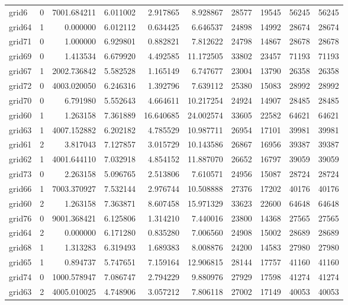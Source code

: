 \begin{longtable}{|l|r|r|r|r|r|r|r|r|r|}
grid6 & 0 & 7001.684211 & 6.011002 & 2.917865 & 8.928867 & 28577 & 19545 & 56245 & 56245 \\
grid64 & 1 & 0.000000 & 6.012112 & 0.634425 & 6.646537 & 24898 & 14992 & 28674 & 28674 \\
grid71 & 0 & 1.000000 & 6.929801 & 0.882821 & 7.812622 & 24798 & 14867 & 28678 & 28678 \\
grid69 & 0 & 1.413534 & 6.679920 & 4.492585 & 11.172505 & 33802 & 23457 & 71193 & 71193 \\
grid67 & 1 & 2002.736842 & 5.582528 & 1.165149 & 6.747677 & 23004 & 13790 & 26358 & 26358 \\
grid72 & 0 & 4003.020050 & 6.246316 & 1.392796 & 7.639112 & 25380 & 15083 & 28992 & 28992 \\
grid70 & 0 & 6.791980 & 5.552643 & 4.664611 & 10.217254 & 24924 & 14907 & 28485 & 28485 \\
grid60 & 1 & 1.263158 & 7.361889 & 16.640685 & 24.002574 & 33605 & 22582 & 64621 & 64621 \\
grid63 & 1 & 4007.152882 & 6.202182 & 4.785529 & 10.987711 & 26954 & 17101 & 39981 & 39981 \\
grid61 & 2 & 3.817043 & 7.127857 & 3.015729 & 10.143586 & 26867 & 16956 & 39387 & 39387 \\
grid62 & 1 & 4001.644110 & 7.032918 & 4.854152 & 11.887070 & 26652 & 16797 & 39059 & 39059 \\
grid73 & 0 & 2.263158 & 5.096765 & 2.513806 & 7.610571 & 24956 & 15087 & 28724 & 28724 \\
grid66 & 1 & 7003.370927 & 7.532144 & 2.976744 & 10.508888 & 27376 & 17202 & 40176 & 40176 \\
grid60 & 2 & 1.263158 & 7.363871 & 8.607458 & 15.971329 & 33623 & 22600 & 64648 & 64648 \\
grid76 & 0 & 9001.368421 & 6.125806 & 1.314210 & 7.440016 & 23800 & 14368 & 27565 & 27565 \\
grid64 & 2 & 0.000000 & 6.171280 & 0.835280 & 7.006560 & 24908 & 15002 & 28689 & 28689 \\
grid68 & 1 & 1.313283 & 6.319493 & 1.689383 & 8.008876 & 24200 & 14583 & 27980 & 27980 \\
grid65 & 1 & 0.894737 & 5.747651 & 7.159164 & 12.906815 & 28144 & 17757 & 41160 & 41160 \\
grid74 & 0 & 1000.578947 & 7.086747 & 2.794229 & 9.880976 & 27929 & 17598 & 41274 & 41274 \\
grid63 & 2 & 4005.010025 & 4.748906 & 3.057212 & 7.806118 & 27002 & 17149 & 40053 & 40053 \\

\end{longtable}
